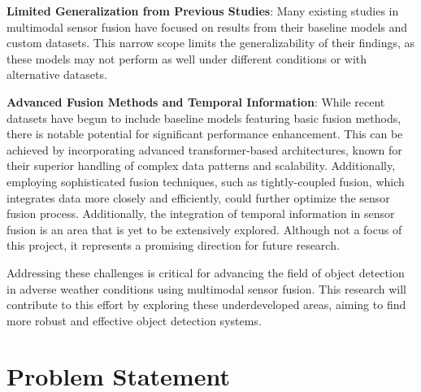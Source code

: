 \documentclass[report.tex]{subfiles}
\begin{document}
        \textbf{Limited Generalization from Previous Studies}: Many existing studies in multimodal sensor fusion have focused on results from their baseline models and custom datasets. This narrow scope limits the generalizability of their findings, as these models may not perform as well under different conditions or with alternative datasets.

        \textbf{Advanced Fusion Methods and Temporal Information}: While recent datasets have begun to include baseline models featuring basic fusion methods, there is notable potential for significant performance enhancement. This can be achieved by incorporating advanced transformer-based architectures, known for their superior handling of complex data patterns and scalability. Additionally, employing sophisticated fusion techniques, such as tightly-coupled fusion, which integrates data more closely and efficiently, could further optimize the sensor fusion process. Additionally, the integration of temporal information in sensor fusion is an area that is yet to be extensively explored. Although not a focus of this project, it represents a promising direction for future research.

        Addressing these challenges is critical for advancing the field of object detection in adverse weather conditions using multimodal sensor fusion. This research will contribute to this effort by exploring these underdeveloped areas, aiming to find more robust and effective object detection systems.

    \section{Problem Statement}

        
\end{document}
